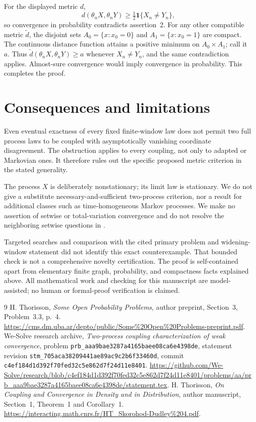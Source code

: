 \documentclass[11pt]{article}
\newcommand{\ind}{\mathbf 1}
\begin{document}
For the displayed metric \(d\),
\[
 d(\theta_nX,\theta_nY)\geq\tfrac12\ind\{X_n\ne Y_n\},
\]
so convergence in probability contradicts assertion~2. For any other compatible metric \(\widetilde d\), the disjoint sets
\(A_0=\{x:x_0=0\}\) and \(A_1=\{x:x_0=1\}\) are compact. The continuous distance function attains a positive minimum on \(A_0\times A_1\); call it \(a\). Thus
\(\widetilde d(\theta_nX,\theta_nY)\geq a\) whenever \(X_n\ne Y_n\), and the same contradiction applies. Almost-sure convergence would imply convergence in probability. This completes the proof.

\section{Consequences and limitations}

Even eventual exactness of every fixed finite-window law does not permit two full process laws to be coupled with asymptotically vanishing coordinate disagreement. The obstruction applies to every coupling, not only to adapted or Markovian ones. It therefore rules out the specific proposed metric criterion in the stated generality.

The process \(X\) is deliberately nonstationary; its limit law is stationary. We do not give a substitute necessary-and-sufficient two-process criterion, nor a result for additional classes such as time-homogeneous Markov processes. We make no assertion of setwise or total-variation convergence and do not resolve the neighboring setwise questions in \cite{thorisson}.

Targeted searches and comparison with the cited primary problem and widening-window statement did not identify this exact counterexample. That bounded check is not a comprehensive novelty certification. The proof is self-contained apart from elementary finite graph, probability, and compactness facts explained above. All mathematical work and checking for this manuscript are model-assisted; no human or formal-proof verification is claimed.

\begin{thebibliography}{9}
 H. Thorisson, \emph{Some Open Probability Problems}, author preprint, Section~3, Problem~3.3, p.~4.
\url{https://cms.dm.uba.ar/depto/public/Some\%20Open\%20Problems-preprint.pdf}.
 We-Solve research archive, \emph{Two-process coupling characterization of weak convergence}, problem \texttt{prb\_aaa9bae3287a4165baee08ca6e4398de}, statement revision \texttt{stm\_705aca38209441ae89ac9c2b6f33460d}, commit \texttt{c4ef184d1d392f70fed32c5e862d7f24d11e8401}.
\url{https://github.com/We-Solve/research/blob/c4ef184d1d392f70fed32c5e862d7f24d11e8401/problems/aa/prb_aaa9bae3287a4165baee08ca6e4398de/statement.tex}.
 H. Thorisson, \emph{On Coupling and Convergence in Density and in Distribution}, author manuscript, Section~1, Theorem~1 and Corollary~1.
\url{https://interacting.math.cnrs.fr/HT_Skorohod-Dudley\%204.pdf}.
\end{thebibliography}
\end{document}
